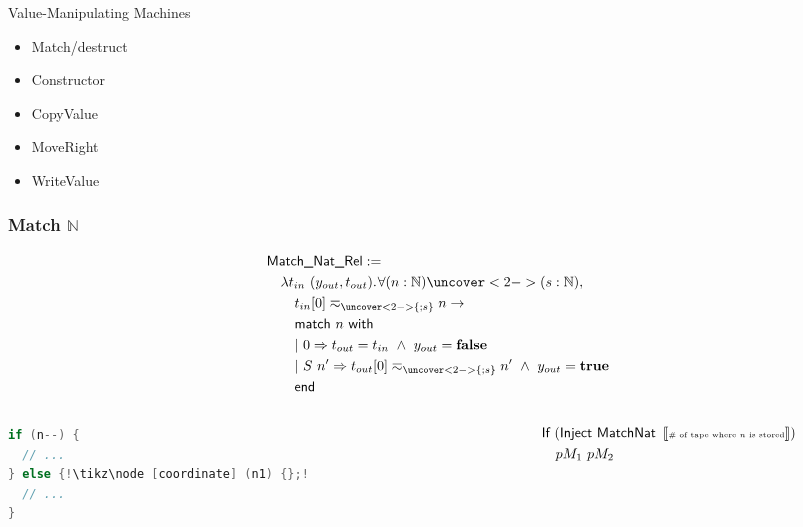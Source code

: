 \documentclass{beamer} %
\renewcommand{\Nat}{\mathbb{N}}
\begin{document}
\begin{frame}{Value-Manipulating Machines}
  \begin{itemize}
  \item Match/destruct
  \item Constructor
  \item CopyValue
  \item MoveRight
  \item WriteValue
  \end{itemize}
\end{frame}


\begin{frame}[fragile] \frametitle{Match $\Nat$}
  \footnotesize

  {\footnotesize
    \begin{align*}
      & \MS{Match\_Nat\_Rel} := \\
      & \quad \lam {t_{in}~(y_{out}, t_{out})} \forall (n:\Nat) \uncover<2->{(s:\Nat)}, \\
      & \quad\quad t_{in}[0] \eqsim_{\uncover<2->{\{;s\}}} n \rightarrow \\
      & \quad\quad \MS{match}~n~\MS{with} \\
      & \quad\quad |~0 \Rightarrow t_{out} = t_{in} ~\land~ y_{out} = \false \\
      & \quad\quad |~S~n' \Rightarrow t_{out}[0]  \eqsim_{\uncover<2->{\{;s\}}} n' ~\land~ y_{out} = \true \\
      & \quad\quad \MS{end}
    \end{align*}
  }

  \pause\pause
  \begin{columns}
    \begin{column}{0.5\textwidth}
      
\begin{lstlisting}[language=c, escapechar=!]
if (n--) {
  // ...
} else {!\tikz\node [coordinate] (n1) {};!
  // ...
}
\end{lstlisting}
    \end{column}
    \begin{column}{0.5\textwidth}
      \begin{align*}
        & \textsf{If}~(\textsf{Inject}~\textsf{MatchNat}~\left\llbracket  \text{\tiny \# of tape where $n$ is stored}  \right\rrbracket) \\
        & \quad pM_1~pM_2
      \end{align*}
    \end{column}
  \end{columns}


\end{frame}
\end{document}
